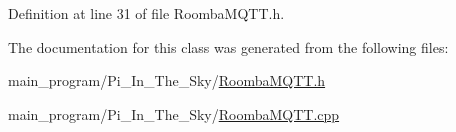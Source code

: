 Definition at line 31 of file Roomba\+M\+Q\+T\+T.\+h.



The documentation for this class was generated from the following files\+:\begin{DoxyCompactItemize}
\item 
main\+\_\+program/\+Pi\+\_\+\+In\+\_\+\+The\+\_\+\+Sky/\hyperlink{_roomba_m_q_t_t_8h}{Roomba\+M\+Q\+T\+T.\+h}\item 
main\+\_\+program/\+Pi\+\_\+\+In\+\_\+\+The\+\_\+\+Sky/\hyperlink{_roomba_m_q_t_t_8cpp}{Roomba\+M\+Q\+T\+T.\+cpp}\end{DoxyCompactItemize}
